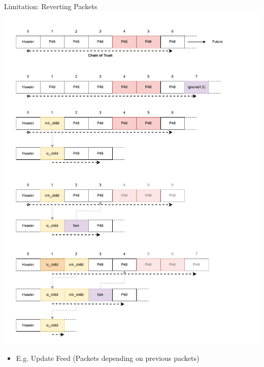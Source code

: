 \documentclass[aspectratio=169]{beamer}
\begin{document}
\begin{frame}[c]{Limitation: Reverting Packets}
        \includegraphics[width=1\textwidth]{images/fork_1.pdf}
        \begin{itemize}
        		\item E.g. Update Feed (Packets depending on previous packets)
	\end{itemize}
\end{frame}
\end{document}

